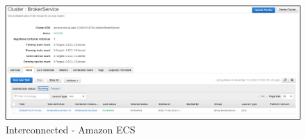 \begin{figure}[!ht]
    \centering
    \includegraphics[width=\linewidth]{document/chapters/chapter_7/images/interconnected_ecs.png}
    \caption{Interconnected - Amazon ECS}
    \label{fig:interconnected_ecs}
\end{figure}